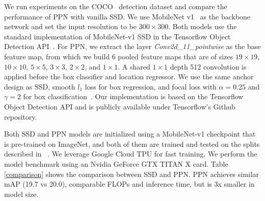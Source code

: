 \documentclass[10pt,twocolumn,letterpaper]{article}
\newcommand{\todo}[1]{\textcolor{red}{[Todo: #1]}}
\begin{document}
We run experiments on the COCO~\cite{lin2014coco} detection dataset
and compare the performance of PPN with vanilla SSD.
We use MobileNet v1~\cite{howard2017mobilenet} as the backbone network
and set the input resolution to be $300\times 300$.
Both models use the standard implementation of MobileNet-v1 SSD in
the Tensorflow Object Detection API~\cite{huang2017gmi}.
For PPN,
we extract the layer \textit{Conv2d\_11\_pointwise} as the base feature map,
from which we build 6 pooled feature maps that are of sizes
$19\times 19$,
$10\times 10$,
$5\times 5$,
$3\times 3$,
$2\times 2$, and
$1\times 1$.
A shared $1\times 1$ depth 512 convolution is applied before the box classifier and location regressor.
We use the same anchor design as SSD,
smooth $l_{1}$ loss for box regression,
and focal loss with $\alpha=0.25$ and $\gamma=2$ for box classification~\cite{lin2017focal}.
Our implementation is based on the Tensorflow Object Detection API
and is publicly available under Tensorflow's Github repository.

Both SSD and PPN models are initialized using a MobileNet-v1 checkpoint
that is pre-trained on ImageNet, and
both of them are trained and tested on the splits described in
~\cite{huang2017gmi}.
We leverage Google Cloud TPU for fast training.
We perform the model benchmark using an Nvidia GeForce GTX TITAN X card.
Table \ref{comparison} shows the comparison between SSD and PPN.
PPN achieves similar mAP (19.7 vs 20.0),
comparable FLOPs and inference time,
but is 3x smaller in model size.



{\small


}
\end{document}
